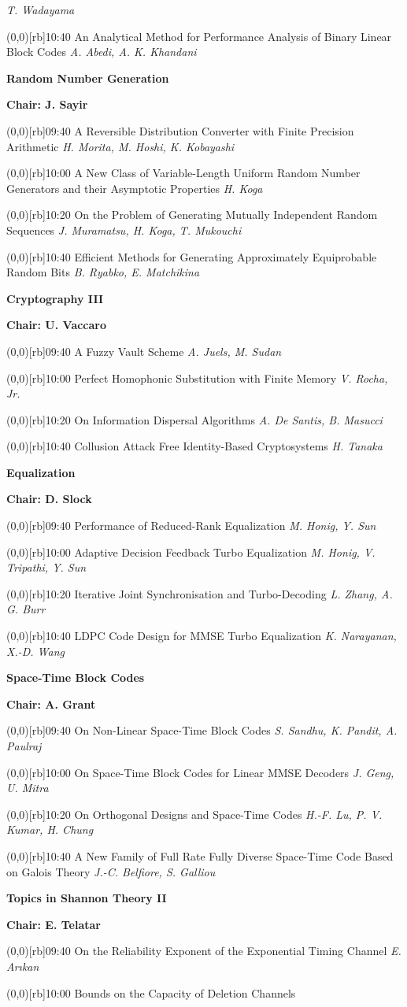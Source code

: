 \documentclass[a5paper,twoside]{article}
\def\sesstitle#1{\vspace{.45\bigskipamount}\par{\bfseries #1}\par}
\def\sesschair#1{{\bfseries Chair: #1}\par\vspace{.65\medskipamount}}
\def\papertime#1{\makebox(0,0)[rb]{{\scriptsize #1}\hspace{.5em}}}
\def\papertitle#1{#1\hfil\break}
\def\paperauthors#1{{\itshape #1}\par\filbreak\vspace{.65\medskipamount}}
\begin{document}
\paperauthors{T. Wadayama}
\papertime{10:40}%
\papertitle{An Analytical Method for Performance Analysis of Binary Linear Block Codes}
\paperauthors{A. Abedi, A. K. Khandani}
\sesstitle{Random Number Generation}
\sesschair{J. Sayir}
\papertime{09:40}%
\papertitle{A Reversible Distribution Converter with Finite Precision Arithmetic}
\paperauthors{H. Morita, M. Hoshi, K. Kobayashi}
\papertime{10:00}%
\papertitle{A New Class of Variable-Length Uniform Random Number Generators and their Asymptotic Properties}
\paperauthors{H. Koga}
\papertime{10:20}%
\papertitle{On the Problem of Generating Mutually Independent Random Sequences}
\paperauthors{J. Muramatsu, H. Koga, T. Mukouchi}
\papertime{10:40}%
\papertitle{Efficient Methods for Generating Approximately Equiprobable Random Bits}
\paperauthors{B. Ryabko, E. Matchikina}
\sesstitle{Cryptography III}
\sesschair{U. Vaccaro}
\papertime{09:40}%
\papertitle{A Fuzzy Vault Scheme}
\paperauthors{A. Juels, M. Sudan}
\papertime{10:00}%
\papertitle{Perfect Homophonic Substitution with Finite Memory}
\paperauthors{V. Rocha, Jr.}
\papertime{10:20}%
\papertitle{On Information Dispersal Algorithms}
\paperauthors{A. De Santis, B. Masucci}
\papertime{10:40}%
\papertitle{Collusion Attack Free Identity-Based Cryptosystems}
\paperauthors{H. Tanaka}
\sesstitle{Equalization}
\sesschair{D. Slock}
\papertime{09:40}%
\papertitle{Performance of Reduced-Rank Equalization}
\paperauthors{M. Honig, Y. Sun}
\papertime{10:00}%
\papertitle{Adaptive Decision Feedback Turbo Equalization}
\paperauthors{M. Honig, V. Tripathi, Y. Sun}
\papertime{10:20}%
\papertitle{Iterative Joint Synchronisation and Turbo-Decoding}
\paperauthors{L. Zhang, A. G. Burr}
\papertime{10:40}%
\papertitle{LDPC Code Design for MMSE Turbo Equalization}
\paperauthors{K. Narayanan, X.-D. Wang}
\sesstitle{Space-Time Block Codes}
\sesschair{A. Grant}
\papertime{09:40}%
\papertitle{On Non-Linear Space-Time Block Codes}
\paperauthors{S. Sandhu, K. Pandit, A. Paulraj}
\papertime{10:00}%
\papertitle{On Space-Time Block Codes for Linear MMSE Decoders}
\paperauthors{J. Geng, U. Mitra}
\papertime{10:20}%
\papertitle{On Orthogonal Designs and Space-Time Codes}
\paperauthors{H.-F. Lu, P. V. Kumar, H. Chung}
\papertime{10:40}%
\papertitle{A New Family of Full Rate Fully Diverse Space-Time Code Based on Galois Theory}
\paperauthors{J.-C. Belfiore, S. Galliou}
\sesstitle{Topics in Shannon Theory II}
\sesschair{E. Telatar}
\papertime{09:40}%
\papertitle{On the Reliability Exponent of the Exponential Timing Channel}
\paperauthors{E. Ar{\i}kan}
\papertime{10:00}%
\papertitle{Bounds on the Capacity of Deletion Channels}
\end{document}
